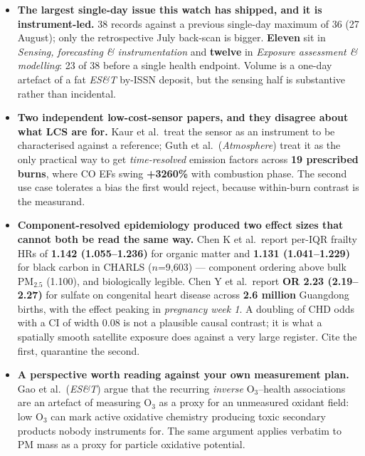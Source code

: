 \documentclass[10pt]{article}
\begin{document}
\footnotesize
\begin{itemize}
\item \textbf{The largest single-day issue this watch has shipped, and it is instrument-led.}
38 records against a previous single-day maximum of 36 (27 August); only the retrospective
July back-scan is bigger. \textbf{Eleven} sit in \textit{Sensing, forecasting \&
instrumentation} and \textbf{twelve} in \textit{Exposure assessment \& modelling}: 23 of
38 before a single health endpoint. Volume is a one-day artefact of a fat \textit{ES\&T}
by-ISSN deposit, but the sensing half is substantive rather than incidental.

\item \textbf{Two independent low-cost-sensor papers, and they disagree about what LCS are for.}
Kaur et al.\ treat the sensor as an instrument to be characterised against a reference;
Guth et al.\ (\textit{Atmosphere}) treat it as the only practical way to get
\emph{time-resolved} emission factors across \textbf{19 prescribed burns}, where CO EFs
swing \textbf{+3260\%} with combustion phase. The second use case tolerates a bias the
first would reject, because within-burn contrast is the measurand.

\item \textbf{Component-resolved epidemiology produced two effect sizes that cannot both be
read the same way.} Chen K et al.\ report per-IQR frailty HRs of
\textbf{1.142 (1.055--1.236)} for organic matter and \textbf{1.131 (1.041--1.229)} for
black carbon in CHARLS ($n$=9{,}603) --- component ordering above bulk PM$_{2.5}$
(1.100), and biologically legible. Chen Y et al.\ report \textbf{OR 2.23 (2.19--2.27)}
for sulfate on congenital heart disease across \textbf{2.6 million} Guangdong births,
with the effect peaking in \emph{pregnancy week 1}. A doubling of CHD odds with a CI of
width 0.08 is not a plausible causal contrast; it is what a spatially smooth
satellite exposure does against a very large register. Cite the first, quarantine the second.

\item \textbf{A perspective worth reading against your own measurement plan.}
Gao et al.\ (\textit{ES\&T}) argue that the recurring \emph{inverse} O$_3$--health
associations are an artefact of measuring O$_3$ as a proxy for an unmeasured oxidant
field: low O$_3$ can mark active oxidative chemistry producing toxic secondary products
nobody instruments for. The same argument applies verbatim to PM mass as a proxy for
particle oxidative potential.


\end{itemize}
\end{document}
